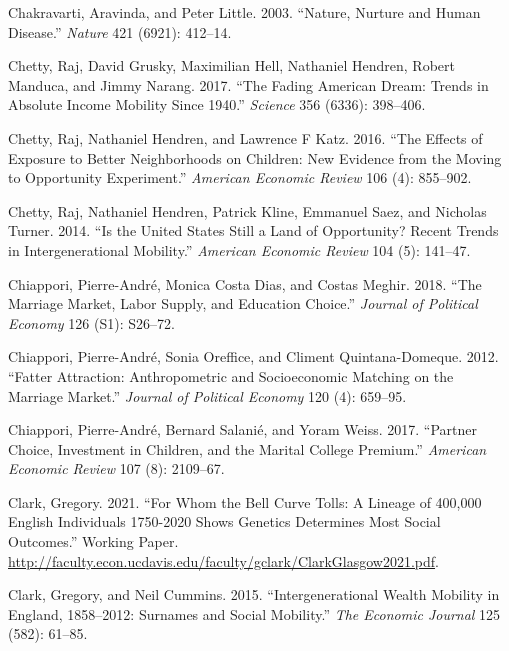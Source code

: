 \documentclass[
]{article}
\newlength{\cslhangindent}
\newlength{\cslentryspacingunit} %
\newenvironment{CSLReferences}[2] %
 {%
  \setlength{\parindent}{0pt}
  \ifodd #1
  \let\oldpar\par
  \def\par{\hangindent=\cslhangindent\oldpar}
  \fi
  \setlength{\parskip}{#2\cslentryspacingunit}
 }%
 {}
\theoremstyle{definition}
\theoremstyle{definition}
\theoremstyle{definition}
\theoremstyle{definition}
\theoremstyle{remark}
\begin{document}
\begin{CSLReferences}{1}{0}
\leavevmode{}%
Chakravarti, Aravinda, and Peter Little. 2003. {``Nature, Nurture and Human Disease.''} \emph{Nature} 421 (6921): 412--14.

\leavevmode{}%
Chetty, Raj, David Grusky, Maximilian Hell, Nathaniel Hendren, Robert Manduca, and Jimmy Narang. 2017. {``The Fading American Dream: Trends in Absolute Income Mobility Since 1940.''} \emph{Science} 356 (6336): 398--406.

\leavevmode{}%
Chetty, Raj, Nathaniel Hendren, and Lawrence F Katz. 2016. {``The Effects of Exposure to Better Neighborhoods on Children: New Evidence from the Moving to Opportunity Experiment.''} \emph{American Economic Review} 106 (4): 855--902.

\leavevmode{}%
Chetty, Raj, Nathaniel Hendren, Patrick Kline, Emmanuel Saez, and Nicholas Turner. 2014. {``Is the United States Still a Land of Opportunity? Recent Trends in Intergenerational Mobility.''} \emph{American Economic Review} 104 (5): 141--47.

\leavevmode{}%
Chiappori, Pierre-André, Monica Costa Dias, and Costas Meghir. 2018. {``The Marriage Market, Labor Supply, and Education Choice.''} \emph{Journal of Political Economy} 126 (S1): S26--72.

\leavevmode{}%
Chiappori, Pierre-André, Sonia Oreffice, and Climent Quintana-Domeque. 2012. {``Fatter Attraction: Anthropometric and Socioeconomic Matching on the Marriage Market.''} \emph{Journal of Political Economy} 120 (4): 659--95.

\leavevmode{}%
Chiappori, Pierre-André, Bernard Salanié, and Yoram Weiss. 2017. {``Partner Choice, Investment in Children, and the Marital College Premium.''} \emph{American Economic Review} 107 (8): 2109--67.

\leavevmode{}%
Clark, Gregory. 2021. {``For Whom the Bell Curve Tolls: A Lineage of 400,000 English Individuals 1750-2020 Shows Genetics Determines Most Social Outcomes.''} Working Paper. \url{http://faculty.econ.ucdavis.edu/faculty/gclark/ClarkGlasgow2021.pdf}.

\leavevmode{}%
Clark, Gregory, and Neil Cummins. 2015. {``Intergenerational Wealth Mobility in England, 1858--2012: Surnames and Social Mobility.''} \emph{The Economic Journal} 125 (582): 61--85.


\end{CSLReferences}
\end{document}
